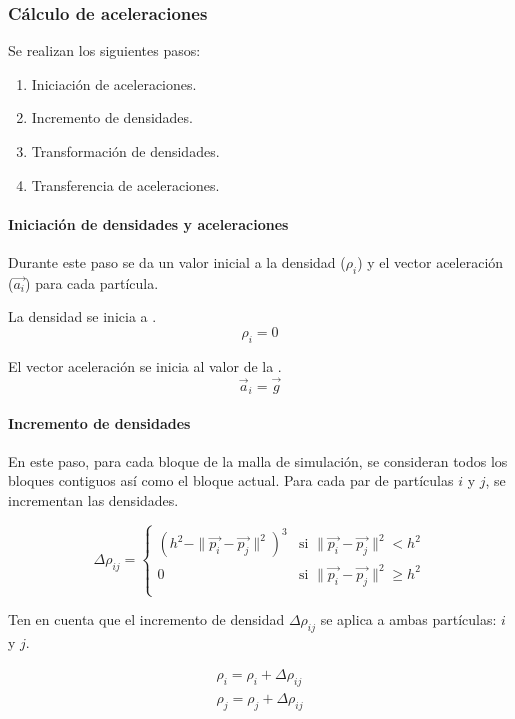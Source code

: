 \subsubsection{Cálculo de aceleraciones}

Se realizan los siguientes pasos:

\begin{enumerate}
\item Iniciación de aceleraciones.
\item Incremento de densidades.
\item Transformación de densidades.
\item Transferencia de aceleraciones.
\end{enumerate}

\paragraph{Iniciación de densidades y aceleraciones}
Durante este paso se da un valor inicial a la densidad ($\rho_i$)
y el vector aceleración ($\vec{a_i}$) para cada partícula.

La densidad se inicia a .
\[
\rho_i = 0
\]

El vector aceleración se inicia al valor de la .
\[
\vec{a}_i = \vec{g}
\]

\paragraph{Incremento de densidades}
En este paso, para cada bloque de la malla de simulación, se consideran todos 
los bloques contiguos así como el bloque actual. Para cada par de partículas
$i$ y $j$, se incrementan las densidades.

\[
\Delta \rho_{ij} = 
    \begin{cases}
      (h^2 - \|\vec{p_i} - \vec{p_j}\|^2)^3 & 
          \text{si  } \|\vec{p_i} - \vec{p_j}\|^2 < h^2\\
      0 & 
          \text{si  } \|\vec{p_i} - \vec{p_j}\|^2 \geq h^2\\
    \end{cases}
\]

Ten en cuenta que el incremento de densidad $\Delta \rho_{ij}$ se aplica a ambas
partículas: $i$ y $j$.

\[
\begin{split}
\rho_i = \rho_i + \Delta \rho_{ij}\\
\rho_j = \rho_j + \Delta \rho_{ij}\\
\end{split}
\]

